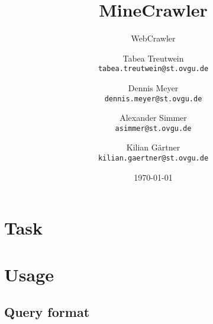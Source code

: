 \documentclass{scrartcl}
\title{MineCrawler}
\subtitle{WebCrawler}
\author{
  Tabea Treutwein\\
  \texttt{tabea.treutwein@st.ovgu.de}\\
  \and
  Dennis Meyer\\
  \texttt{dennis.meyer@st.ovgu.de}\\
  \and
  Alexander Simmer\\
  \texttt{asimmer@st.ovgu.de}\\
  \and
  Kilian Gärtner\\
  \texttt{kilian.gaertner@st.ovgu.de}\\
}
\date{\today}
\begin{document}
\maketitle
 
\section{Task}

\section{Usage}


\subsection{Query format}
\end{document}
